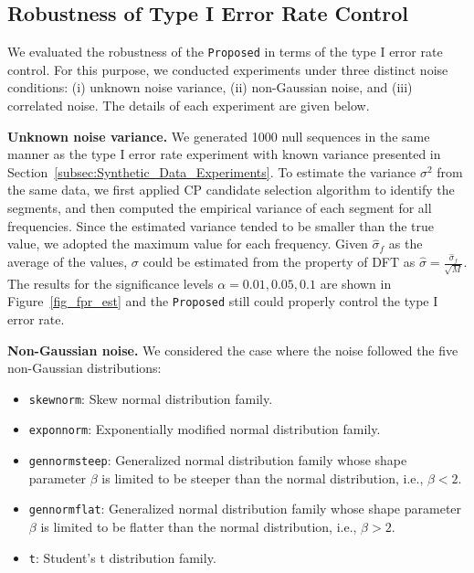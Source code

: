 \subsection{Robustness of Type I Error Rate Control}
\label{Robustness_of_Type_I_Error_Rate_Control}
We evaluated the robustness of the \texttt{Proposed} in terms of the type I error rate control. 
For this purpose, we conducted experiments under three distinct noise conditions: 
(i) unknown noise variance, 
(ii) non-Gaussian noise, and
(iii) correlated noise.
The details of each experiment are given below.

\textbf{Unknown noise variance.}
We generated 1000 null sequences in the same manner as the type I error rate experiment with known variance presented in Section~\ref{subsec:Synthetic_Data_Experiments}.
To estimate the variance $\sigma^2$ from the same data, we first applied CP candidate selection algorithm to identify the segments, and then computed the empirical variance of each segment for all frequencies. 
Since the estimated variance tended to be smaller than the true value, we adopted the maximum value for each frequency. 
Given $\hat{\sigma}_f$ as the average of the values, $\sigma$ could be estimated from the property of DFT as $\hat{\sigma} = \frac{\hat{\sigma}_f}{\sqrt{M}}$.
The results for the significance levels $\alpha = 0.01, 0.05, 0.1$ are shown in Figure~\ref{fig_fpr_est} and the \texttt{Proposed} still could properly control the type I error rate. 

\textbf{Non-Gaussian noise.}
We considered the case where the noise followed the five non-Gaussian distributions:
\begin{itemize}
  \item \texttt{skewnorm}: Skew normal distribution family.
  \item \texttt{exponnorm}: Exponentially modified normal distribution family.
  \item \texttt{gennormsteep}: Generalized normal distribution family whose shape parameter $\beta$ is limited to be steeper than the normal distribution, i.e., $\beta < 2$.
  \item \texttt{gennormflat}: Generalized normal distribution family whose shape parameter $\beta$ is limited to be flatter than the normal distribution, i.e., $\beta > 2$.
  \item \texttt{t}: Student's t distribution family.
\end{itemize}

